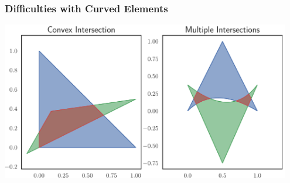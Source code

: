 \documentclass{beamer}
\begin{document}
\begin{frame}
\frametitle{Difficulties with Curved Elements}
\begin{center}
\includegraphics[width=0.95\textwidth]
                {../images/slides/split_intersection.pdf}
\end{center}
\end{frame}
\end{document}
